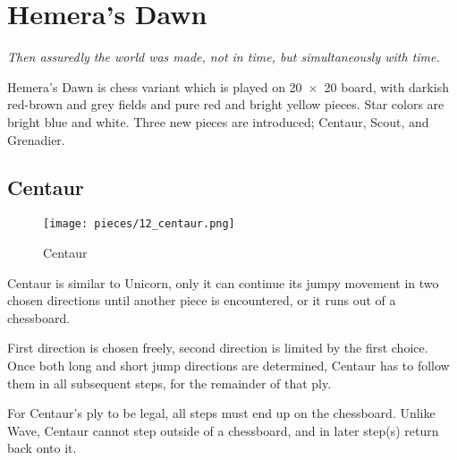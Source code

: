 

\chapter*{Hemera's Dawn}
\label{ch:Hemera's Dawn}

\begin{flushright}
\parbox{0.8\textwidth}{
\emph{Then assuredly the world was made, not in time, but simultaneously with time.\newline
{} } }
\end{flushright}

\noindent
Hemera's Dawn is chess variant which is played on 20~$\times$~20 board,
with darkish red-brown and grey fields and pure red and bright yellow
pieces. Star colors are bright blue and white.
Three new pieces are introduced; Centaur, Scout, and Grenadier.

\clearpage %

\section*{Centaur}
\label{sec:Hemera's Dawn/Centaur}

\noindent
\begin{wrapfigure}[12]{l}{0.4\textwidth}
\centering
\texttt{[image: pieces/12\_centaur.png]}
\caption{Centaur}
\label{fig:12_centaur}
\end{wrapfigure}
Centaur is similar to Unicorn, only it can continue its jumpy movement
in two chosen directions until another piece is encountered, or it runs
out of a chessboard.

First direction is chosen freely, second direction is limited by the first
choice. Once both long and short jump directions are determined, Centaur
has to follow them in all subsequent steps, for the remainder of that ply.

For Centaur's ply to be legal, all steps must end up on the chessboard.
Unlike Wave, Centaur cannot step outside of a chessboard, and in later
step(s) return back onto it.


